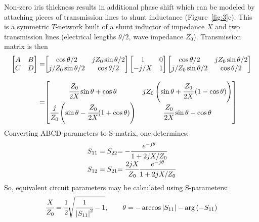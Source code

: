 \documentclass{pj}
\begin{document}
Non-zero iris thickness results in additional phase shift which can be
modeled by attaching pieces of transmission lines to shunt inductance
(Figure~\ref{fig:3}c).  This is a symmetric $T$-network built
of a shunt inductor of impedance $X$ and two transmission lines
(electrical lengths $\theta/2$, wave impedance $Z_0$). Transmission
matrix is then
\begin{equation}
  \label{eq:7}
  \begin{array}{r@{}l}
  \begin{bmatrix}
    A & B \\
    C & D
  \end{bmatrix}
        = & 
  \begin{bmatrix}
    \cos{\theta/2} & j Z_0 \sin{\theta/2} \\
    j/Z_0 \sin{\theta/2} & \cos{\theta/2}
  \end{bmatrix}
  \begin{bmatrix}
    1 & 0 \\
    -j/X & 1
  \end{bmatrix}
  \begin{bmatrix}
    \cos{\theta/2} & j Z_0 \sin{\theta/2} \\
    j/Z_0 \sin{\theta/2} & \cos{\theta/2}
  \end{bmatrix} \\
    & \\
    = &
        \begin{bmatrix}
          \cfrac{Z_0}{2 X} \sin{\theta} + \cos{\theta} & j Z_0
          \left(\sin{\theta + \cfrac{Z_0}{2 X}
              \left(1-\cos{\theta}\right)}\right) \\
          \cfrac{j}{Z_0} \left(\sin{\theta} - \cfrac{Z_0}{2 X} (1 +
            \cos{\theta})\right) & \cfrac{Z_0}{2 X} \sin{\theta} + \cos{\theta}
        \end{bmatrix}
  \end{array}
\end{equation}
Converting ABCD-parameters to S-matrix, one determines:
\begin{equation}
  \label{eq:8}
  \begin{array}{r@{}l}
    S_{11} = S_{22} & = - \cfrac{e^{-j\theta}}{1 + 2jX/Z_0} \\
    S_{12} = S_{21} & = \cfrac{2j X}{Z_0} \cfrac{e^{-j\theta}}{1 + 2jX/Z_0} \\
  \end{array}
\end{equation}
So, equivalent circuit parameters may be calculated using S-parameters:
\begin{equation}
  \label{eq:9}
  \cfrac{X}{Z_0} =
  \cfrac{1}{2}\sqrt{\cfrac{1}{\left|S_{11}\right|^2}-1} , \quad\quad
  \theta = -\arccos{\left|S_{11}\right|} - \arg{\left(-S_{11}\right)}
\end{equation}
\end{document}
